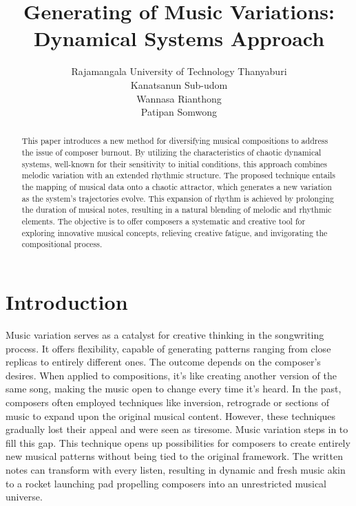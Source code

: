 \documentclass[11pt]{article}
\title{Generating of Music Variations: Dynamical Systems Approach}
\author{Rajamangala University of Technology Thanyaburi\\Kanatsanun Sub-udom\\Wannasa Rianthong\\Patipan Somwong}
\theoremstyle{definition}
\begin{document}
\maketitle
\begin{abstract}
This paper introduces a new method for diversifying musical compositions to address the issue of composer burnout. By utilizing the characteristics of chaotic dynamical systems, well-known for their sensitivity to initial conditions, this approach combines melodic variation with an extended rhythmic structure. The proposed technique entails the mapping of musical data onto a chaotic attractor, which generates a new variation as the system's trajectories evolve. This expansion of rhythm is achieved by prolonging the duration of musical notes, resulting in a natural blending of melodic and rhythmic elements. The objective is to offer composers a systematic and creative tool for exploring innovative musical concepts, relieving creative fatigue, and invigorating the compositional process.
\end{abstract}

\section{Introduction}
Music variation serves as a catalyst for creative thinking in the songwriting process. It offers flexibility, capable of generating patterns ranging from close replicas to entirely different ones. The outcome depends on the composer's desires. When applied to compositions, it's like creating another version of the same song, making the music open to change every time it's heard. In the past, composers often employed techniques like inversion, retrograde or sections of music to expand upon the original musical content. However, these techniques gradually lost their appeal and were seen as tiresome. Music variation steps in to fill this gap. This technique opens up possibilities for composers to create entirely new musical patterns without being tied to the original framework. The written notes can transform with every listen, resulting in dynamic and fresh music akin to a rocket launching pad propelling composers into an unrestricted musical universe.
\end{document}

